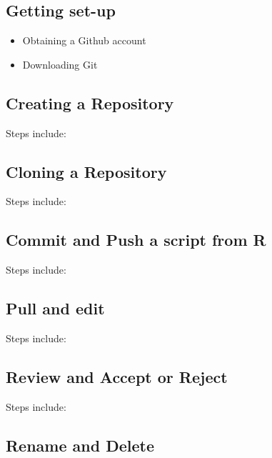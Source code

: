 \documentclass[
]{article}
\providecommand{\tightlist}{%
  \setlength{\itemsep}{0pt}\setlength{\parskip}{0pt}}
\begin{document}
\hypertarget{getting-set-up}{%
\subsection{Getting set-up}\label{getting-set-up}}

\begin{itemize}
\tightlist
\item
  Obtaining a Github account
\item
  Downloading Git
\end{itemize}

\hypertarget{creating-a-repository}{%
\subsection{Creating a Repository}\label{creating-a-repository}}

Steps include:

\hypertarget{cloning-a-repository}{%
\subsection{Cloning a Repository}\label{cloning-a-repository}}

Steps include:

\hypertarget{commit-and-push-a-script-from-r}{%
\subsection{Commit and Push a script from
R}\label{commit-and-push-a-script-from-r}}

Steps include:

\hypertarget{pull-and-edit}{%
\subsection{Pull and edit}\label{pull-and-edit}}

Steps include:

\hypertarget{review-and-accept-or-reject}{%
\subsection{Review and Accept or
Reject}\label{review-and-accept-or-reject}}

Steps include:

\hypertarget{rename-and-delete}{%
\subsection{Rename and Delete}\label{rename-and-delete}}
\end{document}
